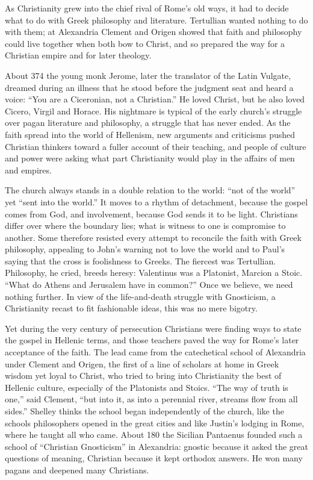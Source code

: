 
\begin{inbrief}
As Christianity grew into the chief rival of Rome's old ways, it had to decide what to do with Greek
philosophy and literature. Tertullian wanted nothing to do with them; at Alexandria Clement and Origen
showed that faith and philosophy could live together when both bow to Christ, and so prepared the way
for a Christian empire and for later theology.
\end{inbrief}

About 374 the young monk Jerome, later the translator of the Latin Vulgate, dreamed during an illness
that he stood before the judgment seat and heard a voice: ``You are a Ciceronian, not a Christian.''
He loved Christ, but he also loved Cicero, Virgil and Horace. His nightmare is typical of the early
church's struggle over pagan literature and philosophy, a struggle that has never ended. As the faith
spread into the world of Hellenism, new arguments and criticisms pushed Christian thinkers toward a
fuller account of their teaching, and people of culture and power were asking what part Christianity
would play in the affairs of men and empires.

The church always stands in a double relation to the world: ``not of the world'' yet ``sent into the
world.'' It moves to a rhythm of detachment, because the gospel comes from God, and involvement,
because God sends it to be light. Christians differ over where the boundary lies; what is witness to
one is compromise to another. Some therefore resisted every attempt to reconcile the faith with Greek
philosophy, appealing to John's warning not to love the world and to Paul's saying that the cross is
foolishness to Greeks. The fiercest was Tertullian. Philosophy, he cried, breeds heresy: Valentinus
was a Platonist, Marcion a Stoic. ``What do Athens and Jerusalem have in common?'' Once we believe,
we need nothing further. In view of the life-and-death struggle with Gnosticism, a Christianity recast
to fit fashionable ideas, this was no mere bigotry.

Yet during the very century of persecution Christians were finding ways to state the gospel in
Hellenic terms, and those teachers paved the way for Rome's later acceptance of the faith. The lead
came from the catechetical school of Alexandria under Clement and Origen, the first of a line of
scholars at home in Greek wisdom yet loyal to Christ, who tried to bring into Christianity the best of
Hellenic culture, especially of the Platonists and Stoics. ``The way of truth is one,'' said Clement,
``but into it, as into a perennial river, streams flow from all sides.'' Shelley thinks the school
began independently of the church, like the schools philosophers opened in the great cities and like
Justin's lodging in Rome, where he taught all who came. About 180 the Sicilian Pantaenus founded such
a school of ``Christian Gnosticism'' in Alexandria: gnostic because it asked the great questions of
meaning, Christian because it kept orthodox answers. He won many pagans and deepened many Christians.

